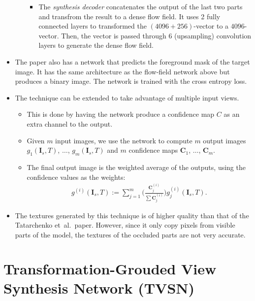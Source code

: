 \documentclass[10pt]{article}
\newcommand{\ve}[1]{\pmb{#1}}
\newcommand{\etal}{{et~al.}}
\begin{document}
\begin{itemize}
\begin{itemize}
\begin{itemize}
	  		\item The \emph{synthesis decoder} concatenates the output of the last two parts and transfrom the result to a dense flow field. It uses 2 fully connected layers to transformed the $(4096+256)$-vector to a $4096$-vector. Then, the vector is passed through 6 (upsampling) convolution layers to generate the dense flow field.
  		\end{itemize}
  	\end{itemize}

  	\item The paper also has a network that predicts the foreground mask of the target image. It has the same architecture as the flow-field network above but produces a binary image. The network is trained with the cross entropy loss.

  	\item The technique can be extended to take advantage of multiple input views. 
  	\begin{itemize}
  		\item This is done by having the network produce a confidence map ${C}$ as an extra channel to the output. 

  		\item Given $m$ input images, we use the network to compute $m$ output images $g_1(\ve{I}_s, T)$, $\dotsc$, $g_m(\ve{I}_s, T)$ and $m$ confidence maps $\ve{C}_1$, $\dotsc$, $\ve{C}_m$.

  		\item The final output image is the weighted average of the outputs, using the confidence values as the weights:
  		\begin{align*}
  			g^{(i)}(\ve{I}_s, T) 
  			:=
  			\sum_{j=1}^m \bigg( \frac{\ve{C}^{(i)}_j}{ \sum \ve{C}^{(i)}_j} \bigg) g^{(i)}_j(\ve{I}_s, T).
  		\end{align*}
  	\end{itemize}

  	\item The textures generated by this technique is of higher quality than that of the Tatarchenko \etal~paper. However, since it only copy pixels from visible parts of the model, the textures of the occluded parts are not very accurate.
  \end{itemize}

  \section{Transformation-Grouded View Synthesis Network (TVSN)}
\end{document}
